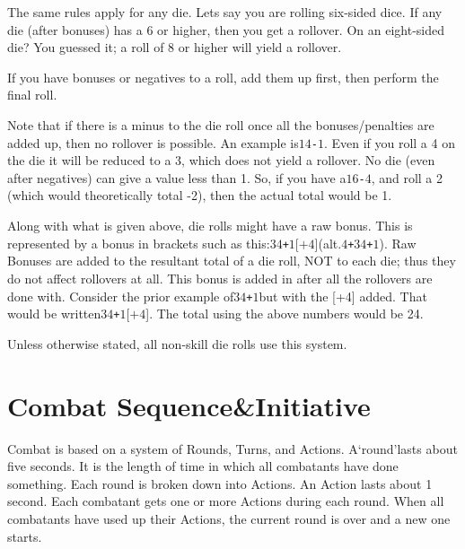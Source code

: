 \documentclass[twoside]{book}
\begin{document}
    {  
    The same rules apply for any die. Lets say you are rolling six-sided dice. If any die (after bonuses) has a 6 or higher, then you get a rollover. On an eight-sided die? You guessed it; a roll of 8 or higher will yield a rollover.
    }
  
    {  
    If you have bonuses or negatives to a roll, add them up first, then perform the final roll.
    }
  
    {  
    Note that if there is a minus to the die roll once all the bonuses/penalties are added up, then no rollover is possible. An example is\ensuremath{1}\ensuremath{4}\texttt{-}\ensuremath{1}. Even if you roll a 4 on the die it will be reduced to a 3, which does not yield a rollover. No die (even after negatives) can give a value less than 1. So, if you have a\ensuremath{1}\ensuremath{6}\texttt{-}\ensuremath{4}, and roll a 2 (which would theoretically total -2), then the actual total would be 1.
    }
  
    {  
    Along with what is given above, die rolls might have a raw bonus. This is represented by a bonus in brackets such as this:\ensuremath{3}\ensuremath{4}\texttt{+}\ensuremath{1}\textscbf{}[\ensuremath{\texttt{+}\ensuremath{4}}](alt.\ensuremath{4}\texttt{+}\ensuremath{3}\ensuremath{4}\texttt{+}\ensuremath{1}). Raw Bonuses are added to the resultant total of a die roll, NOT to each die; thus they do not affect rollovers at all. This bonus is added in after all the rollovers are done with. Consider the prior example of\ensuremath{3}\ensuremath{4}\texttt{+}\ensuremath{1}but with the [+4] added. That would be written\ensuremath{3}\ensuremath{4}\texttt{+}\ensuremath{1}\textscbf{}[\ensuremath{\texttt{+}\ensuremath{4}}]. The total using the above numbers would be 24.
    }
  
    {  
    Unless otherwise stated, all non-skill die rolls use this system.
    }
  
    

\section{Combat Sequence\&Initiative}
    
    {  
    Combat is based on a system of Rounds, Turns, and Actions. A`round'lasts about five seconds. It is the length of time in which all combatants have done something. Each round is broken down into Actions. An Action lasts about 1 second. Each combatant gets one or more Actions during each round. When all combatants have used up their Actions, the current round is over and a new one starts.
    }
  
\end{document}
